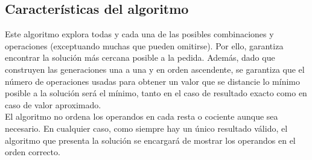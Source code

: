 \subsection{Características del algoritmo}
Este algoritmo explora todas y cada una de las posibles combinaciones y operaciones
(exceptuando muchas que pueden omitirse). Por ello, garantiza encontrar la
solución más cercana posible a la pedida. Además, dado que construyen las
generaciones una a una y en orden ascendente, se garantiza que el número de
operaciones usadas para obtener un valor que se distancie lo mínimo posible
a la solución será el mínimo, tanto en el caso de resultado exacto como en
caso de valor aproximado.\\

El algoritmo no ordena los operandos en cada resta o cociente aunque sea necesario.
En cualquier caso, como siempre hay un único resultado válido, el algoritmo que
presenta la solución se encargará de mostrar los operandos en el orden correcto.
